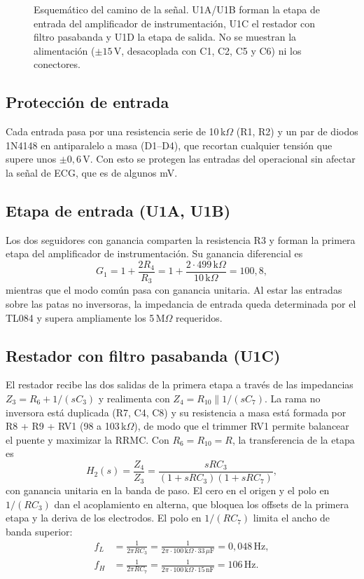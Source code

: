 \documentclass[journal,a4paper]{IEEEtran}
\begin{document}
\begin{figure}[!t]
\centering
\resizebox{\columnwidth}{!}{}
\caption{Esquemático del camino de la señal. U1A/U1B forman la etapa de entrada del amplificador de instrumentación, U1C el restador con filtro pasabanda y U1D la etapa de salida. No se muestran la alimentación ($\pm 15$\,V, desacoplada con C1, C2, C5 y C6) ni los conectores.}
\label{fig:esquematico}
\end{figure}

\subsection{Protección de entrada}
Cada entrada pasa por una resistencia serie de 10\,k$\Omega$ (R1, R2) y un par de diodos 1N4148 en antiparalelo a masa (D1--D4), que recortan cualquier tensión que supere unos $\pm 0{,}6$\,V. Con esto se protegen las entradas del operacional sin afectar la señal de ECG, que es de algunos mV.

\subsection{Etapa de entrada (U1A, U1B)}
Los dos seguidores con ganancia comparten la resistencia R3 y forman la primera etapa del amplificador de instrumentación. Su ganancia diferencial es
\begin{equation}
G_1 = 1 + \frac{2R_4}{R_3} = 1 + \frac{2\cdot 499\,\text{k}\Omega}{10\,\text{k}\Omega} = 100{,}8,
\end{equation}
mientras que el modo común pasa con ganancia unitaria. Al estar las entradas sobre las patas no inversoras, la impedancia de entrada queda determinada por el TL084 y supera ampliamente los 5\,M$\Omega$ requeridos.

\subsection{Restador con filtro pasabanda (U1C)}
El restador recibe las dos salidas de la primera etapa a través de las impedancias $Z_3 = R_6 + 1/(sC_3)$ y realimenta con $Z_4 = R_{10}\parallel 1/(sC_7)$. La rama no inversora está duplicada (R7, C4, C8) y su resistencia a masa está formada por R8 + R9 + RV1 (98 a 103\,k$\Omega$), de modo que el trimmer RV1 permite balancear el puente y maximizar la RRMC. Con $R_6 = R_{10} = R$, la transferencia de la etapa es
\begin{equation}
H_2(s) = \frac{Z_4}{Z_3} = \frac{sRC_3}{(1+sRC_3)(1+sRC_7)},
\end{equation}
con ganancia unitaria en la banda de paso. El cero en el origen y el polo en $1/(RC_3)$ dan el acoplamiento en alterna, que bloquea los offsets de la primera etapa y la deriva de los electrodos. El polo en $1/(RC_7)$ limita el ancho de banda superior:
\begin{align}
f_L &= \frac{1}{2\pi R C_3} = \frac{1}{2\pi\cdot 100\,\text{k}\Omega\cdot 33\,\mu\text{F}} = 0{,}048\,\text{Hz},\\
f_H &= \frac{1}{2\pi R C_7} = \frac{1}{2\pi\cdot 100\,\text{k}\Omega\cdot 15\,\text{nF}} = 106\,\text{Hz}.
\end{align}
\end{document}
